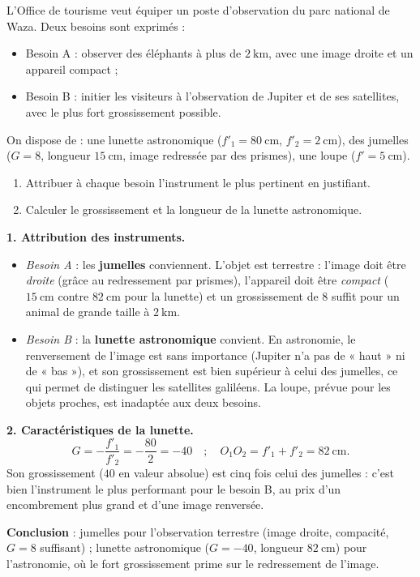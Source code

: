 \documentclass[11pt]{article}
\begin{document}
\begin{exoresolu}
L'Office de tourisme veut équiper un poste d'observation du parc national de Waza. Deux besoins sont exprimés :
\begin{itemize}
\item[\textbullet] Besoin A : observer des éléphants à plus de $2\ \text{km}$, avec une image droite et un appareil compact ;
\item[\textbullet] Besoin B : initier les visiteurs à l'observation de Jupiter et de ses satellites, avec le plus fort grossissement possible.
\end{itemize}
On dispose de : une lunette astronomique ($f'_1 = 80\ \text{cm}$, $f'_2 = 2\ \text{cm}$), des jumelles ($G = 8$, longueur $15\ \text{cm}$, image redressée par des prismes), une loupe ($f' = 5\ \text{cm}$).
\begin{enumerate}
\item Attribuer à chaque besoin l'instrument le plus pertinent en justifiant.
\item Calculer le grossissement et la longueur de la lunette astronomique.
\end{enumerate}
\tcblower
\textbf{1. Attribution des instruments.}
\begin{itemize}
\item \emph{Besoin A} : les \textbf{jumelles} conviennent. L'objet est terrestre : l'image doit être \emph{droite} (grâce au redressement par prismes), l'appareil doit être \emph{compact} ($15\ \text{cm}$ contre $82\ \text{cm}$ pour la lunette) et un grossissement de $8$ suffit pour un animal de grande taille à $2\ \text{km}$.
\item \emph{Besoin B} : la \textbf{lunette astronomique} convient. En astronomie, le renversement de l'image est sans importance (Jupiter n'a pas de « haut » ni de « bas »), et son grossissement est bien supérieur à celui des jumelles, ce qui permet de distinguer les satellites galiléens. La loupe, prévue pour les objets proches, est inadaptée aux deux besoins.
\end{itemize}

\textbf{2. Caractéristiques de la lunette.}
\[ G = -\dfrac{f'_1}{f'_2} = -\dfrac{80}{2} = -40 \quad ; \quad O_1O_2 = f'_1 + f'_2 = 82\ \text{cm}. \]
Son grossissement ($40$ en valeur absolue) est cinq fois celui des jumelles : c'est bien l'instrument le plus performant pour le besoin B, au prix d'un encombrement plus grand et d'une image renversée.

\textbf{Conclusion} : jumelles pour l'observation terrestre (image droite, compacité, $G = 8$ suffisant) ; lunette astronomique ($G = -40$, longueur $82\ \text{cm}$) pour l'astronomie, où le fort grossissement prime sur le redressement de l'image.
\end{exoresolu}
\end{document}
